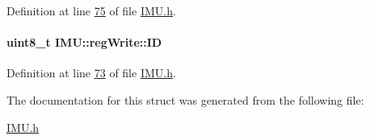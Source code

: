 Definition at line \hyperlink{_i_m_u_8h_source_l00075}{75} of file \hyperlink{_i_m_u_8h_source}{IMU.h}.

\hypertarget{struct_i_m_u_1_1reg_write_aca32b881a20ec7adc84956176aa65a7b}{
\paragraph[{ID}]{\setlength{\rightskip}{0pt plus 5cm}uint8\_\-t {\bf IMU::regWrite::ID}}\hfill}
\label{struct_i_m_u_1_1reg_write_aca32b881a20ec7adc84956176aa65a7b}


Definition at line \hyperlink{_i_m_u_8h_source_l00073}{73} of file \hyperlink{_i_m_u_8h_source}{IMU.h}.



The documentation for this struct was generated from the following file:\begin{DoxyCompactItemize}
\item 
\hyperlink{_i_m_u_8h}{IMU.h}\end{DoxyCompactItemize}
